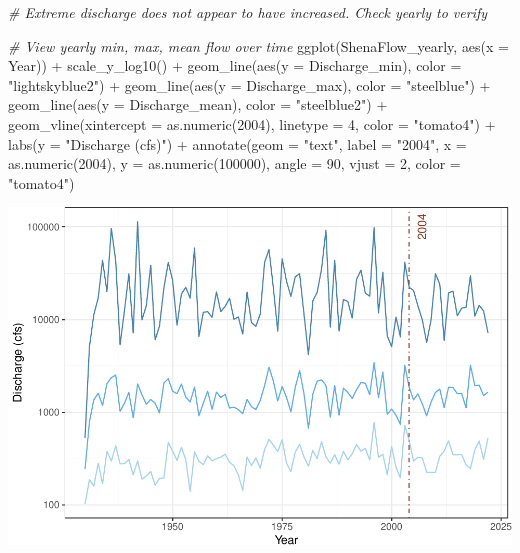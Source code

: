 \documentclass[
  12pt,
]{article}
\newenvironment{Shaded}{\begin{snugshade}}{\end{snugshade}}
\newcommand{\AttributeTok}[1]{\textcolor[rgb]{0.77,0.63,0.00}{#1}}
\newcommand{\CommentTok}[1]{\textcolor[rgb]{0.56,0.35,0.01}{\textit{#1}}}
\newcommand{\DecValTok}[1]{\textcolor[rgb]{0.00,0.00,0.81}{#1}}
\newcommand{\FunctionTok}[1]{\textcolor[rgb]{0.00,0.00,0.00}{#1}}
\newcommand{\NormalTok}[1]{#1}
\newcommand{\SpecialCharTok}[1]{\textcolor[rgb]{0.00,0.00,0.00}{#1}}
\newcommand{\StringTok}[1]{\textcolor[rgb]{0.31,0.60,0.02}{#1}}
\begin{document}
\begin{Shaded}
\begin{Highlighting}[]
\CommentTok{\# Extreme discharge does not appear to have increased. Check yearly to verify}

\CommentTok{\# View yearly min, max, mean flow over time}
\FunctionTok{ggplot}\NormalTok{(ShenaFlow\_yearly, }\FunctionTok{aes}\NormalTok{(}\AttributeTok{x =}\NormalTok{ Year)) }\SpecialCharTok{+}
  \FunctionTok{scale\_y\_log10}\NormalTok{() }\SpecialCharTok{+}
  \FunctionTok{geom\_line}\NormalTok{(}\FunctionTok{aes}\NormalTok{(}\AttributeTok{y =}\NormalTok{ Discharge\_min), }\AttributeTok{color =} \StringTok{"lightskyblue2"}\NormalTok{) }\SpecialCharTok{+}
  \FunctionTok{geom\_line}\NormalTok{(}\FunctionTok{aes}\NormalTok{(}\AttributeTok{y =}\NormalTok{ Discharge\_max), }\AttributeTok{color =} \StringTok{"steelblue"}\NormalTok{) }\SpecialCharTok{+}
  \FunctionTok{geom\_line}\NormalTok{(}\FunctionTok{aes}\NormalTok{(}\AttributeTok{y =}\NormalTok{ Discharge\_mean), }\AttributeTok{color =} \StringTok{"steelblue2"}\NormalTok{) }\SpecialCharTok{+}
  \FunctionTok{geom\_vline}\NormalTok{(}\AttributeTok{xintercept =} \FunctionTok{as.numeric}\NormalTok{(}\DecValTok{2004}\NormalTok{), }
             \AttributeTok{linetype =} \DecValTok{4}\NormalTok{, }\AttributeTok{color =} \StringTok{"tomato4"}\NormalTok{) }\SpecialCharTok{+}
  \FunctionTok{labs}\NormalTok{(}\AttributeTok{y =} \StringTok{"Discharge (cfs)"}\NormalTok{) }\SpecialCharTok{+}
  \FunctionTok{annotate}\NormalTok{(}\AttributeTok{geom =} \StringTok{"text"}\NormalTok{,}
           \AttributeTok{label =} \StringTok{"2004"}\NormalTok{,}
           \AttributeTok{x =} \FunctionTok{as.numeric}\NormalTok{(}\DecValTok{2004}\NormalTok{),}
           \AttributeTok{y =} \FunctionTok{as.numeric}\NormalTok{(}\DecValTok{100000}\NormalTok{),}
           \AttributeTok{angle =} \DecValTok{90}\NormalTok{, }
           \AttributeTok{vjust =} \DecValTok{2}\NormalTok{,}
           \AttributeTok{color =} \StringTok{"tomato4"}\NormalTok{)}
\end{Highlighting}
\end{Shaded}

\includegraphics{Project_Template_files/figure-latex/Flow.analysis-2.pdf}
\end{document}
